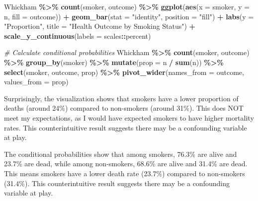 \documentclass[
]{article}
\newenvironment{Shaded}{\begin{snugshade}}{\end{snugshade}}
\newcommand{\AttributeTok}[1]{\textcolor[rgb]{0.13,0.29,0.53}{#1}}
\newcommand{\CommentTok}[1]{\textcolor[rgb]{0.56,0.35,0.01}{\textit{#1}}}
\newcommand{\FunctionTok}[1]{\textcolor[rgb]{0.13,0.29,0.53}{\textbf{#1}}}
\newcommand{\NormalTok}[1]{#1}
\newcommand{\SpecialCharTok}[1]{\textcolor[rgb]{0.81,0.36,0.00}{\textbf{#1}}}
\newcommand{\StringTok}[1]{\textcolor[rgb]{0.31,0.60,0.02}{#1}}
\begin{document}
\begin{Shaded}
\begin{Highlighting}[]
\NormalTok{Whickham }\SpecialCharTok{\%\textgreater{}\%}
  \FunctionTok{count}\NormalTok{(smoker, outcome) }\SpecialCharTok{\%\textgreater{}\%}
  \FunctionTok{ggplot}\NormalTok{(}\FunctionTok{aes}\NormalTok{(}\AttributeTok{x =}\NormalTok{ smoker, }\AttributeTok{y =}\NormalTok{ n, }\AttributeTok{fill =}\NormalTok{ outcome)) }\SpecialCharTok{+}
  \FunctionTok{geom\_bar}\NormalTok{(}\AttributeTok{stat =} \StringTok{"identity"}\NormalTok{, }\AttributeTok{position =} \StringTok{"fill"}\NormalTok{) }\SpecialCharTok{+}
  \FunctionTok{labs}\NormalTok{(}\AttributeTok{y =} \StringTok{"Proportion"}\NormalTok{, }\AttributeTok{title =} \StringTok{"Health Outcome by Smoking Status"}\NormalTok{) }\SpecialCharTok{+}
  \FunctionTok{scale\_y\_continuous}\NormalTok{(}\AttributeTok{labels =}\NormalTok{ scales}\SpecialCharTok{::}\NormalTok{percent)}
\end{Highlighting}
\end{Shaded}

\begin{Shaded}
\begin{Highlighting}[]
\CommentTok{\# Calculate conditional probabilities}
\NormalTok{Whickham }\SpecialCharTok{\%\textgreater{}\%}
  \FunctionTok{count}\NormalTok{(smoker, outcome) }\SpecialCharTok{\%\textgreater{}\%}
  \FunctionTok{group\_by}\NormalTok{(smoker) }\SpecialCharTok{\%\textgreater{}\%}
  \FunctionTok{mutate}\NormalTok{(}\AttributeTok{prop =}\NormalTok{ n }\SpecialCharTok{/} \FunctionTok{sum}\NormalTok{(n)) }\SpecialCharTok{\%\textgreater{}\%}
  \FunctionTok{select}\NormalTok{(smoker, outcome, prop) }\SpecialCharTok{\%\textgreater{}\%}
  \FunctionTok{pivot\_wider}\NormalTok{(}\AttributeTok{names\_from =}\NormalTok{ outcome, }\AttributeTok{values\_from =}\NormalTok{ prop)}
\end{Highlighting}
\end{Shaded}

Surprisingly, the visualization shows that smokers have a lower
proportion of deaths (around 24\%) compared to non-smokers (around
31\%). This does NOT meet my expectations, as I would have expected
smokers to have higher mortality rates. This counterintuitive result
suggests there may be a confounding variable at play.

The conditional probabilities show that among smokers, 76.3\% are alive
and 23.7\% are dead, while among non-smokers, 68.6\% are alive and
31.4\% are dead. This means smokers have a lower death rate (23.7\%)
compared to non-smokers (31.4\%). This counterintuitive result suggests
there may be a confounding variable at play.
\end{document}
